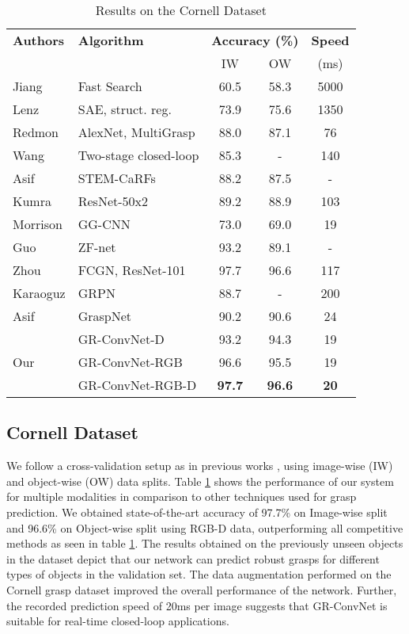 \documentclass[letterpaper, 10pt, conference]{IEEEtran}
\begin{document}
\begin{table}
\begin{center}
\vspace*{0.1cm}
\caption{Results on the Cornell Dataset}
\label{tab:cornell_results}
\begin{tabular}{l|l|cc|c}
\hline
\textbf{Authors} & \textbf{Algorithm} & \multicolumn{2}{|c|}{\textbf{Accuracy (\%)}} & \textbf{Speed} \\
& & IW & OW & (ms)\\
\hline
Jiang \cite{jiang2011efficient} & Fast Search & 60.5 & 58.3 & 5000 \\
Lenz \cite{lenz2015deep} & SAE, struct. reg. & 73.9 & 75.6 & 1350 \\
Redmon \cite{redmon2015real} & AlexNet, MultiGrasp & 88.0 & 87.1 & 76 \\
Wang \cite{wang2016robot} & Two-stage closed-loop & 85.3 & - & 140 \\
Asif \cite{asif2017rgb} & STEM-CaRFs & 88.2 & 87.5 & - \\
Kumra \cite{kumra2017robotic} & ResNet-50x2 & 89.2 & 88.9 & 103 \\
Morrison \cite{morrison2019learning} & GG-CNN & 73.0 & 69.0 & 19 \\
Guo \cite{guo2017hybrid} & ZF-net & 93.2 & 89.1 & - \\
Zhou \cite{zhou2018fully} & FCGN, ResNet-101 & 97.7 & 96.6 & 117 \\
Karaoguz \cite{karaoguz2019object} & GRPN & 88.7 & - & 200 \\
Asif \cite{asif2018graspnet} & GraspNet & 90.2 & 90.6 & 24 \\
\hline
 & GR-ConvNet-D & 93.2 & 94.3 & 19 \\
Our & GR-ConvNet-RGB & 96.6 & 95.5 & 19 \\
 & GR-ConvNet-RGB-D & \textbf{97.7} & \textbf{96.6} & \textbf{20} \\
\hline
\end{tabular}
\end{center}
\end{table}

\subsection{Cornell Dataset} \label{Cornell results}
We follow a cross-validation setup as in previous works \cite{lenz2015deep, redmon2015real, kumra2017robotic, asif2018graspnet, guo2017hybrid}, using image-wise (IW) and object-wise (OW) data splits. Table \ref{tab:cornell_results} shows the performance of our system for multiple modalities in comparison to other techniques used for grasp prediction. We obtained state-of-the-art accuracy of 97.7\% on Image-wise split and 96.6\% on Object-wise split using RGB-D data, outperforming all competitive methods as seen in table \ref{tab:cornell_results}. The results obtained on the previously unseen objects in the dataset depict that our network can predict robust grasps for different types of objects in the validation set. The data augmentation performed on the Cornell grasp dataset improved the overall performance of the network. Further, the recorded prediction speed of 20ms per image suggests that GR-ConvNet is suitable for real-time closed-loop applications.
\end{document}
